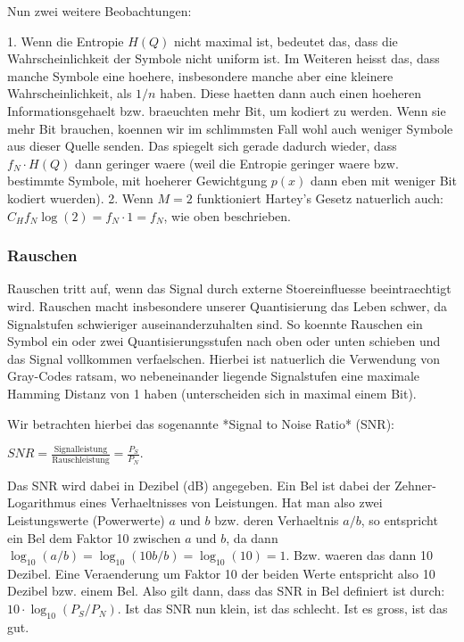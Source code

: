 Nun zwei weitere Beobachtungen:

1. Wenn die Entropie $H(Q)$ nicht maximal ist, bedeutet das, dass die
   Wahrscheinlichkeit der Symbole nicht uniform ist. Im Weiteren heisst das,
   dass manche Symbole eine hoehere, insbesondere manche aber eine kleinere
   Wahrscheinlichkeit, als $1/n$ haben. Diese haetten dann auch einen hoeheren
   Informationsgehaelt bzw. braeuchten mehr Bit, um kodiert zu werden. Wenn sie
   mehr Bit brauchen, koennen wir im schlimmsten Fall wohl auch weniger Symbole
   aus dieser Quelle senden. Das spiegelt sich gerade dadurch wieder, dass $f_N
   \cdot H(Q)$ dann geringer waere (weil die Entropie geringer waere
   bzw. bestimmte Symbole, mit hoeherer Gewichtgung $p(x)$ dann eben mit weniger
   Bit kodiert wuerden).
2. Wenn $M = 2$ funktioniert Hartey's Gesetz natuerlich auch: $C_H f_N\log(2) =
   f_N \cdot 1 = f_N$, wie oben beschrieben.

\subsubsection{ Rauschen}

Rauschen tritt auf, wenn das Signal durch externe Stoereinfluesse
beeintraechtigt wird. Rauschen macht insbesondere unserer Quantisierung das
Leben schwer, da Signalstufen schwieriger auseinanderzuhalten sind. So koennte
Rauschen ein Symbol ein oder zwei Quantisierungsstufen nach oben oder unten
schieben und das Signal vollkommen verfaelschen. Hierbei ist natuerlich die
Verwendung von Gray-Codes ratsam, wo nebeneinander liegende Signalstufen eine
maximale Hamming Distanz von 1 haben (unterscheiden sich in maximal einem Bit).

Wir betrachten hierbei das sogenannte *Signal to Noise Ratio* (SNR):

$SNR = \frac{\text{Signalleistung}}{\text{Rauschleistung}} =
\frac{P_S}{P_N} .$

Das SNR wird dabei in Dezibel (dB) angegeben. Ein Bel ist dabei der
Zehner-Logarithmus eines Verhaeltnisses von Leistungen. Hat man also zwei
Leistungswerte (Powerwerte) $a$ und $b$ bzw. deren Verhaeltnis $a/b$, so
entspricht ein Bel dem Faktor 10 zwischen $a$ und $b$, da dann $\log_{10}(a/b) =
\log_{10}(10b/b) = \log_{10}(10) = 1$. Bzw. waeren das dann 10 Dezibel. Eine
Veraenderung um Faktor 10 der beiden Werte entspricht also 10 Dezibel bzw. einem
Bel. Also gilt dann, dass das SNR in Bel definiert ist durch: $10 \cdot
\log_{10}(P_S/P_N)$. Ist das SNR nun klein, ist das schlecht. Ist es gross, ist
das gut.

